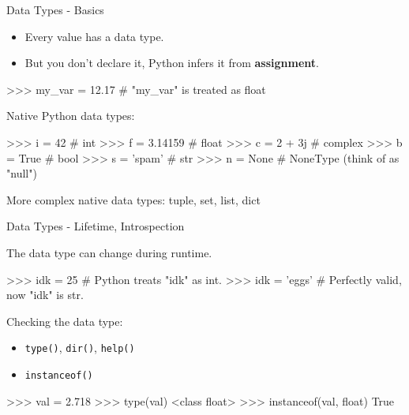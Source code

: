 \documentclass[10pt]{beamer}
\begin{document}
\begin{frame}[fragile]{Data Types - Basics}
	\begin{itemize}
	\item \pause Every value has a data type.
	\item \pause But you don't declare it, Python infers it from \textbf{assignment}.
	\end{itemize}

	 \begin{pythoncode}
		>>> my_var = 12.17   # "my_var" is treated as float
	\end{pythoncode}

	\pause
	Native Python data types:
	
	 \begin{pythoncode}
		>>> i = 42      # int
		>>> f = 3.14159 # float
		>>> c = 2 + 3j  # complex
		>>> b = True    # bool
		>>> s = 'spam'  # str
		>>> n = None    # NoneType (think of as "null")
	\end{pythoncode}

	\pause
	More complex native data types: tuple, set, list, dict
\end{frame}

\begin{frame}[fragile]{Data Types - Lifetime, Introspection}
	
	\pause
	The data type can change during runtime.
	
	\pause	
	\begin{pythoncode}
		>>>  idk = 25      # Python treats "idk" as int.
		>>>  idk = 'eggs'  # Perfectly valid, now "idk" is str.
	\end{pythoncode}
	
	\pause
	Checking the data type:
	\begin{itemize}
		\item \pause \small{\texttt{type()}, \texttt{dir()}, \texttt{help()}}
		\item \pause \small{\texttt{instanceof()}}
	\end{itemize}
	
	\pause
	\begin{pythoncode}
		>>> val = 2.718
		>>> type(val)
		<class float>
		>>> instanceof(val, float)
		True
	\end{pythoncode}
\end{frame}

\end{document}
